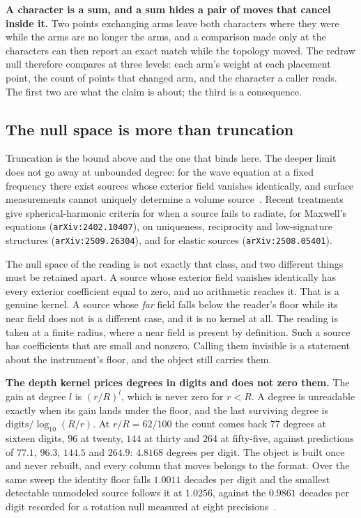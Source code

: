 \textbf{A character is a sum, and a sum hides a pair of moves that cancel inside it.} Two points exchanging arms leave both characters where they were while the arms are no longer the arms, and a comparison made only at the characters can then report an exact match while the topology moved. The redraw null therefore compares at three levels: each arm's weight at each placement point, the count of points that changed arm, and the character a caller reads. The first two are what the claim is about; the third is a consequence.

\subsection{The null space is more than truncation}

Truncation is the bound above and the one that binds here. The deeper limit does not go away at unbounded degree: for the wave equation at a fixed frequency there exist sources whose exterior field vanishes identically, and surface measurements cannot uniquely determine a volume source~\cite{src:Bleistein-and-Cohen-1977}. Recent treatments give spherical-harmonic criteria for when a source fails to radiate, for Maxwell's equations (\texttt{arXiv:2402.10407}), on uniqueness, reciprocity and low-signature structures (\texttt{arXiv:2509.26304}), and for elastic sources (\texttt{arXiv:2508.05401}).

The null space of the reading is not exactly that class, and two different things must be retained apart. A source whose exterior field vanishes identically has every exterior coefficient equal to zero, and no arithmetic reaches it. That is a genuine kernel. A source whose \emph{far} field falls below the reader's floor while its near field does not is a different case, and it is no kernel at all. The reading is taken at a finite radius, where a near field is present by definition. Such a source has coefficients that are small and nonzero. Calling them invisible is a statement about the instrument's floor, and the object still carries them.

\textbf{The depth kernel prices degrees in digits and does not zero them.} The gain at degree \(l\) is \((r/R)^l\), which is never zero for \(r < R\). A degree is unreadable exactly when its gain lands under the floor, and the last surviving degree is \(\text{digits} / \log_{10}(R/r)\). At \(r/R = 62/100\) the count comes back \(77\) degrees at sixteen digits, \(96\) at twenty, \(144\) at thirty and \(264\) at fifty-five, against predictions of \(77.1\), \(96.3\), \(144.5\) and \(264.9\): \(4.8168\) degrees per digit. The object is built once and never rebuilt, and every column that moves belongs to the format. Over the same sweep the identity floor falls \(1.0011\) decades per digit and the smallest detectable unmodeled source follows it at \(1.0256\), against the \(0.9861\) decades per digit recorded for a rotation null measured at eight precisions~\cite{src:Quigg-orior-workbook}.

